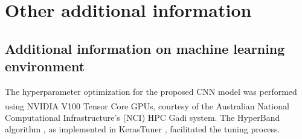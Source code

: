 \documentclass[a4paper, 12pt]{article}
\begin{document}
\newpage

\section{Other additional information}
\label{supp_sec4_env}

\subsection{Additional information on machine learning environment}
\label{supp_sec4.1_ml_env}

The hyperparameter optimization for the proposed CNN model was performed using NVIDIA\textsuperscript{\textregistered} V100 Tensor Core GPUs,
courtesy of the Australian National Computational Infrastructure's (NCI) HPC Gadi system.
The HyperBand algorithm \cite{li2018hyperband}, as implemented in
KerasTuner \cite{omalley2019kerastuner}, facilitated the tuning process.
\end{document}
